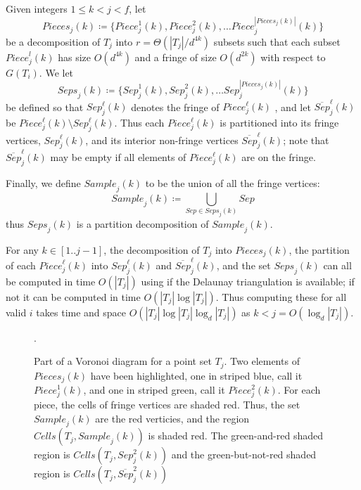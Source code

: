 \documentclass[10pt,a4paper]{amsart}
\newcommand{\Cells}{\mathit{Cells}}
\newcommand{\Sample}{\mathit{Sample}}
\newcommand{\Piece}{\mathit{Piece}}
\newcommand{\Pieces}{\mathit{Pieces}}
\newcommand{\Sep}{\mathit{Sep}}
\newcommand{\Seps}{\mathit{Seps}}
\newcommand{\john}[1]{\textcolor{red}{#1}}
\begin{document}
Given integers $1 \leq k<j<f$, let 
\[
    \Pieces_j(k) \coloneqq \{\Piece_j^1(k), \Piece^2_j(k), \ldots  \Piece^{|\Pieces_j(k)|}_j(k)\}
\]
be a decomposition of $T_j$ into $r=\Theta(|T_j|/d^{4k})$ subsets such that each subset $\Piece^l_j(k)$  has size $O(d^{4k})$
and a fringe of size $O({d^{2k}})$ with respect to $G(T_i)$. We let \[ \Seps_j(k) \coloneqq \{\Sep_j^1(k), \Sep^2_j(k), \ldots  \Sep^{|\Pieces_j(k)|}_j(k)\}\] be defined so that 
$\Sep_j^\ell(k)$ denotes the fringe of $\Piece_j^\ell(k)$ , and let $\overline{Sep}_j^\ell(k)$ be $\Piece_j^\ell(k) \setminus \Sep_j^\ell(k)$. 
Thus each $\Piece_j^\ell(k)$  is partitioned into its fringe vertices, $\Sep_j^\ell(k)$, and its interior non-fringe  vertices $\overline{\Sep}_j^\ell(k)$; note that $\overline{\Sep}_j^\ell(k)$ may be empty if all elements of $\Piece_j^\ell(k)$ are on the fringe.

Finally, we define $\Sample_j(k)$ to be the union of all the fringe vertices: 
\[\Sample_j(k) \coloneqq \bigcup_{Sep \in \Seps_j(k)} Sep \]
thus $\Seps_j(k)$ is a partition decomposition of $\Sample_j(k)$.


For any $k\in [1.. j-1]$, the decomposition of $T_j$ into $\Pieces_j(k)$,
the partition  of each $\Piece_j^\ell(k)$ into 
$\Sep_j^\ell(k)$ and $\overline{Sep}_j^\ell(k)$, 
and the set $\Seps_j(k)$  can all be computed in time $O(|T_j|)$ using \cite{KleinMS13} if the Delaunay triangulation is available; if not it can be computed in time $O(|T_j| \log |T_j|)$. Thus computing these for all valid $i$ takes time and space $O(|T_j| \log |T_j| \log_d |T_j|)$ as $k < j=O(\log_d |T_j|)$. %
\begin{figure}[t]
    \centering
    \caption{Part of a Voronoi diagram for a point set $T_j$.
    Two elements of $\Pieces_j(k)$ have been highlighted, one in striped blue, call it $\Piece_j^1(k)$, and one in striped green, call it $\Piece_j^2(k)$.
    For each piece, the cells of fringe vertices are shaded red. Thus, the set $\Sample_j(k)$ are the red verticies, and the region $\Cells(T_j,\Sample_j(k))$ is shaded red.
    The green-and-red shaded region is $\Cells(T_j,\Sep_j^2(k))$ and the green-but-not-red shaded region is $\Cells(T_j,\overline{\Sep}_j^2(k))$}.
    \label{fig:separ}
\end{figure}
\end{document}
